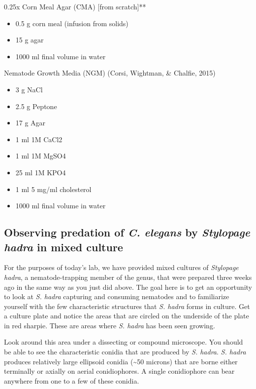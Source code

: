 \documentclass[]{book}
\providecommand{\tightlist}{%
  \setlength{\itemsep}{0pt}\setlength{\parskip}{0pt}}
\begin{document}
0.25x Corn Meal Agar (CMA) {[}from scratch{]}**

\begin{itemize}
\tightlist
\item
  0.5 g corn meal (infusion from solids)
\item
  15 g agar
\item
  1000 ml final volume in water
\end{itemize}

{Nematode Growth Media (NGM) (Corsi, Wightman, \& Chalfie, 2015)}

\begin{itemize}
\tightlist
\item
  3 g NaCl
\item
  2.5 g Peptone
\item
  17 g Agar
\item
  1 ml 1M CaCl2
\item
  1 ml 1M MgSO4
\item
  25 ml 1M KPO4
\item
  1 ml 5 mg/ml cholesterol
\item
  1000 ml final volume in water
\end{itemize}

\hypertarget{observing-predation-of-c.-elegans-by-stylopage-hadra-in-mixed-culture}{%
\subsection{\texorpdfstring{Observing predation of \emph{C. elegans} by \emph{Stylopage} \emph{hadra} in mixed culture}{Observing predation of C. elegans by Stylopage hadra in mixed culture}}\label{observing-predation-of-c.-elegans-by-stylopage-hadra-in-mixed-culture}}

For the purposes of today's lab, we have provided mixed cultures of \emph{Stylopage hadra}, a nematode-trapping member of the genus, that were prepared three weeks ago in the same way as you just did above. The goal here is to get an opportunity to look at \emph{S. hadra} capturing and consuming nematodes and to familiarize yourself with the few characteristic structures that \emph{S. hadra} forms in culture. Get a culture plate and notice the areas that are circled on the underside of the plate in red sharpie. These are areas where \emph{S. hadra} has been seen growing.

Look around this area under a dissecting or compound microscope. You should be able to see the characteristic conidia that are produced by \emph{S. hadra}. \emph{S. hadra} produces relatively large ellipsoid conidia (\textasciitilde50 microns) that are borne either terminally or axially on aerial conidiophores. A single conidiophore can bear anywhere from one to a few of these conidia.
\end{document}
